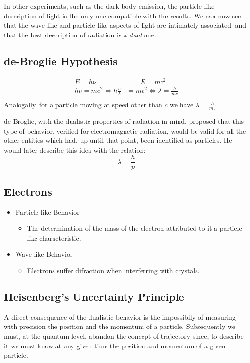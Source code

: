 \documentclass{article}[10pt]
\begin{document}
In other experiments, such as the dark-body emission, the particle-like
description of light is the only one compatible with the results. We can now see
that the wave-like and particle-like aspects of light are intimately associated,
and that the best description of radiation is a \emph{dual} one.
\subsection{de-Broglie Hypothesis}
\begin{align*}
    E=h\nu &\qquad E=mc^2\\
    h\nu=mc^2 \iff h\frac{c}{\lambda} &= mc^2 \iff \lambda = \frac{h}{mc}\\
\end{align*}
Analogally, for a particle moving at speed other than $c$ we have $\lambda = \frac{h}{mv}$

de-Broglie, with the dualistic properties of radiation in mind,
proposed that this type of behavior, verified for electromagnetic radiation,
would be valid for all the other entities which had, up until that point, been
identified as particles. He would later describe this idea with the
relation:
$$\lambda = \frac{h}{p}$$
\subsection{Electrons}
\begin{itemize}
    \item Particle-like Behavior
          \begin{itemize}
              \item The determination of the mass of the electron attributed to
                    it a particle-like characteristic.
          \end{itemize}
    \item Wave-like Behavior
          \begin{itemize}
              \item Electrons suffer difraction when interferring with crystals.
          \end{itemize}
\end{itemize}
\subsection{Heisenberg's Uncertainty Principle}
A direct consequence of the dualistic behavior is the impossibily of measuring
with precision the position and the momentum of a particle. Subsequently we
must, at the quantum level, abandon the concept of trajectory since, to describe
it we must know at any given time the position and momentum of a given particle.
\end{document}
